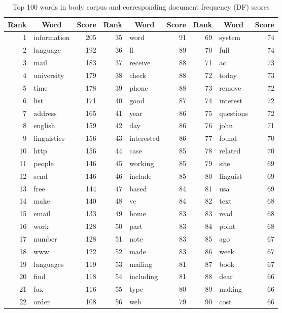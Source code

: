 \documentclass[10pt, a4paper]{article}
\begin{document}
\begin{table}[H]
\centering
\caption{Top 100 words in body corpus and corresponding document frequency (DF) scores}\vspace{1em}
\begin{tabular}{@{}rlrrlrrlr@{}}
\toprule
\textbf{Rank} & \multicolumn{1}{c}{\textbf{Word}} & \textbf{Score}
	& \textbf{Rank} & \multicolumn{1}{c}{\textbf{Word}} & \textbf{Score}
	& \textbf{Rank} & \multicolumn{1}{c}{\textbf{Word}} & \textbf{Score}\\
\midrule
1 & information & 205 & 35 & word & 91 & 69 & system & 74 \\
2 & language & 192 & 36 & ll & 89 & 70 & full & 74 \\
3 & mail & 183 & 37 & receive & 88 & 71 & ac & 73 \\
4 & university & 179 & 38 & check & 88 & 72 & today & 73 \\
5 & time & 178 & 39 & phone & 88 & 73 & remove & 72 \\
6 & list & 171 & 40 & good & 87 & 74 & interest & 72 \\
7 & address & 165 & 41 & year & 86 & 75 & questions & 72 \\
8 & english & 159 & 42 & day & 86 & 76 & john & 71 \\
9 & linguistics & 156 & 43 & interested & 86 & 77 & found & 70 \\
10 & http & 156 & 44 & case & 85 & 78 & related & 70 \\
11 & people & 146 & 45 & working & 85 & 79 & site & 69 \\
12 & send & 146 & 46 & include & 85 & 80 & linguist & 69 \\
13 & free & 144 & 47 & based & 84 & 81 & usa & 69 \\
14 & make & 140 & 48 & ve & 84 & 82 & text & 68 \\
15 & email & 133 & 49 & home & 83 & 83 & read & 68 \\
16 & work & 128 & 50 & part & 83 & 84 & point & 68 \\
17 & number & 128 & 51 & note & 83 & 85 & ago & 67 \\
18 & www & 122 & 52 & made & 83 & 86 & week & 67 \\
19 & languages & 119 & 53 & mailing & 81 & 87 & book & 67 \\
20 & find & 118 & 54 & including & 81 & 88 & dear & 66 \\
21 & fax & 116 & 55 & type & 80 & 89 & making & 66 \\
22 & order & 108 & 56 & web & 79 & 90 & cost & 66 \\

\end{tabular}
\end{table}
\end{document}
